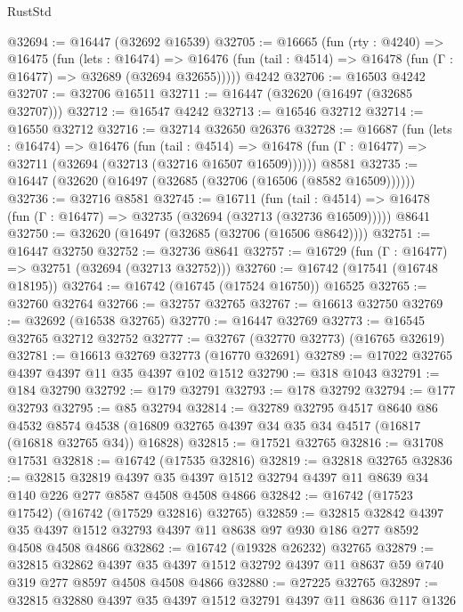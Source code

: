 \begin{lexlean}{RustStd}
\begin{coremodule}
{\begin{coremodule}
{{{{{{{{{{{{{{{{{{{{{{{{{{{{{{{{{{{{{{{{{{{{{{{{{{{{{{{@32694 := @16447 (@32692 @16539)
@32705 := @16665
    (fun (rty : @4240) =>
    @16475
      (fun (lets : @16474) =>
      @16476 (fun (tail : @4514) => @16478 (fun (Γ : @16477) => @32689 (@32694 @32655)))))
    @4242
@32706 := @16503 @4242
@32707 := @32706 @16511
@32711 := @16447 (@32620 (@16497 (@32685 @32707)))
@32712 := @16547 @4242
@32713 := @16546 @32712
@32714 := @16550 @32712
@32716 := @32714 @32650 @26376
@32728 := @16687
    (fun (lets : @16474) =>
    @16476
      (fun (tail : @4514) =>
      @16478 (fun (Γ : @16477) => @32711 (@32694 (@32713 (@32716 @16507 @16509))))))
    @8581
@32735 := @16447 (@32620 (@16497 (@32685 (@32706 (@16506 (@8582 @16509))))))
@32736 := @32716 @8581
@32745 := @16711
    (fun (tail : @4514) => @16478 (fun (Γ : @16477) => @32735 (@32694 (@32713 (@32736 @16509)))))
    @8641
@32750 := @32620 (@16497 (@32685 (@32706 (@16506 @8642))))
@32751 := @16447 @32750
@32752 := @32736 @8641
@32757 := @16729 (fun (Γ : @16477) => @32751 (@32694 (@32713 @32752)))
@32760 := @16742 (@17541 (@16748 @18195))
@32764 := @16742 (@16745 (@17524 @16750)) @16525
@32765 := @32760 @32764
@32766 := @32757 @32765
@32767 := @16613 @32750
@32769 := @32692 (@16538 @32765)
@32770 := @16447 @32769
@32773 := @16545 @32765 @32712 @32752
@32777 := @32767 (@32770 @32773) (@16765 @32619)
@32781 := @16613 @32769 @32773 (@16770 @32691)
@32789 := @17022 @32765 @4397 @4397 @11 @35 @4397 @102 @1512
@32790 := @318 @1043
@32791 := @184 @32790
@32792 := @179 @32791
@32793 := @178 @32792
@32794 := @177 @32793
@32795 := @85 @32794
@32814 := @32789
    @32795
    @4517
    @8640
    @86
    @4532
    @8574
    @4538
    (@16809 @32765 @4397 @34 @35 @34 @4517 (@16817 (@16818 @32765 @34)) @16828)
@32815 := @17521 @32765
@32816 := @31708 @17531
@32818 := @16742 (@17535 @32816)
@32819 := @32818 @32765
@32836 := @32815
    @32819
    @4397
    @35
    @4397
    @1512
    @32794
    @4397
    @11
    @8639
    @34
    @140
    @226
    @277
    @8587
    @4508
    @4508
    @4866
@32842 := @16742 (@17523 @17542) (@16742 (@17529 @32816) @32765)
@32859 := @32815
    @32842
    @4397
    @35
    @4397
    @1512
    @32793
    @4397
    @11
    @8638
    @97
    @930
    @186
    @277
    @8592
    @4508
    @4508
    @4866
@32862 := @16742 (@19328 @26232) @32765
@32879 := @32815
    @32862
    @4397
    @35
    @4397
    @1512
    @32792
    @4397
    @11
    @8637
    @59
    @740
    @319
    @277
    @8597
    @4508
    @4508
    @4866
@32880 := @27225 @32765
@32897 := @32815
    @32880
    @4397
    @35
    @4397
    @1512
    @32791
    @4397
    @11
    @8636
    @117
    @1326
}}}}}}}}}}}}}}}}}}}}}}}}}}}}}}}}}}}}}}}}}}}}}}}}}}}}}}}
\end{coremodule}}
\end{coremodule}
\end{lexlean}
